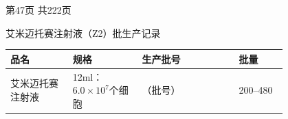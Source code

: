 \documentclass[UTF8,10pt,a4paper,fontset=fandol]{ctexart}
\newcommand{\fieldvalue}[1]{#1}
\newcommand{\handwritten}[1]{#1}
\begin{document}
\begin{center}
第47页 共222页
\end{center}

\newpage

\begin{center}
{\Large 艾米迈托赛注射液（Z2）批生产记录}
\end{center}

\begin{tabular}{|p{0.18\linewidth}|p{0.20\linewidth}|p{0.28\linewidth}|p{0.14\linewidth}|}
\hline
品名 & 规格 & 生产批号 & 批量 \\ \hline
\fieldvalue{艾米迈托赛注射液} &
\fieldvalue{12ml：$6.0\times10^{7}$个细胞} &
\fieldvalue{\handwritten{（批号）}} &
\fieldvalue{200--480}
\\ \hline
\end{tabular}

\vspace{0.3em}
\end{document}
